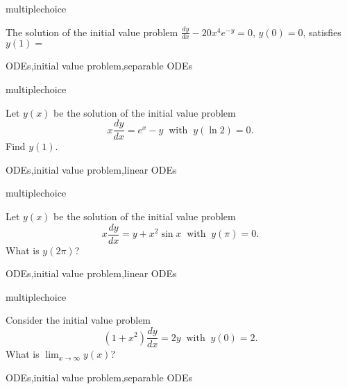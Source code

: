 \documentclass{ximera}
\begin{document}
\begin{question}[2015C.07]
\begin{type}
multiplechoice
\end{type}
The solution of the initial value problem \(\displaystyle \frac{dy}{dx} - 20 x^4 e^{-y} = 0\),  \(y(0) = 0\),
satisfies \(y(1) = \)
\begin{multiplechoice}
\end{multiplechoice}
\begin{keywords}
ODEs,initial value problem,separable ODEs
\end{keywords}
\end{question}

\begin{question}[2016C.13]
\begin{type}
multiplechoice
\end{type}
Let \(y(x)\) be the solution of the initial value problem
\[ x \frac{dy}{dx} = e^x - y \ \text{ with } \ y(\ln 2) = 0. \]
Find \(y(1)\).
\begin{multiplechoice}
\end{multiplechoice}
\begin{keywords}
ODEs,initial value problem,linear ODEs
\end{keywords}
\end{question}

\begin{question}[2017C.07]
\begin{type}
multiplechoice
\end{type}
Let \(y(x)\) be the solution of the initial value problem
\[ x \frac{dy}{dx} = y + x^2 \sin x \ \text{ with } \ y (\pi) = 0. \]
What is \(y(2 \pi)\)?
\begin{multiplechoice}
\choice{\(-\pi\)}
\choice{\(-2\pi\)}
\choice[correct]{\(-4\pi\)}
\choice{\(2\pi\)}
\choice{\(4\pi\)}
\end{multiplechoice}
\begin{keywords}
ODEs,initial value problem,linear ODEs
\end{keywords}
\end{question}

\begin{question}[2017C.08]
\begin{type}
multiplechoice
\end{type}
Consider the initial value problem
\[ (1 + x^2) \frac{dy}{dx} = 2y \ \text{ with } \ y(0) = 2. \]
What is \(\displaystyle \lim_{x \rightarrow \infty} y(x)\)?
\begin{multiplechoice}
\end{multiplechoice}
\begin{keywords}
ODEs,initial value problem,separable ODEs
\end{keywords}
\end{question}
\end{document}
